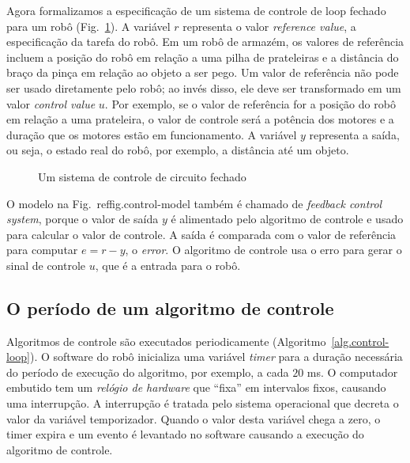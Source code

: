 Agora formalizamos a especificação de um sistema de controle de loop fechado para um robô (Fig.~\ref{fig.control-model}). A variável $r$ representa o valor \emph{reference value}, a especificação da tarefa do robô. Em um robô de armazém, os valores de referência incluem a posição do robô em relação a uma pilha de prateleiras e a distância do braço da pinça em relação ao objeto a ser pego. Um valor de referência não pode ser usado diretamente pelo robô; ao invés disso, ele deve ser transformado em um valor \emph{control value} $u$. Por exemplo, se o valor de referência for a posição do robô em relação a uma prateleira, o valor de controle será a potência dos motores e a duração que os motores estão em funcionamento. A variável $y$ representa a saída, ou seja, o estado real do robô, por exemplo, a distância até um objeto.

\begin{figure}
\begin{center}
\caption{Um sistema de controle de circuito fechado}\label{fig.control-model}
\end{center}
\end{figure}

O modelo na Fig.~ref{fig.control-model} também é chamado de \emph{feedback control system}, porque o valor de saída $y$ é alimentado pelo algoritmo de controle e usado para calcular o valor de controle. A saída é comparada com o valor de referência para computar $e=r-y$, o \emph{error}. O algoritmo de controle usa o erro para gerar o sinal de controle $u$, que é a entrada para o robô.

\subsection{O período de um algoritmo de controle}

Algoritmos de controle são executados periodicamente (Algoritmo~\ref{alg.control-loop}). O software do robô inicializa uma variável \emph{timer} para a duração necessária do período de execução do algoritmo, por exemplo, a cada $20$ ms. O computador embutido tem um \emph{relógio de hardware} que ``fixa'' em intervalos fixos, causando uma interrupção. A interrupção é tratada pelo sistema operacional que decreta o valor da variável temporizador. Quando o valor desta variável chega a zero, o timer expira e um evento é levantado no software causando a execução do algoritmo de controle.

